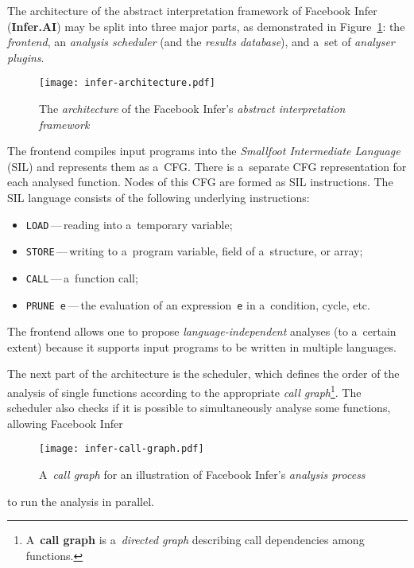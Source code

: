 The architecture of the abstract interpretation framework of Facebook Infer (\textbf{Infer.AI}) may be split into three major parts, as demonstrated in Figure~\ref{fig:inferArch}: the \emph{frontend}, an \emph{analysis scheduler} (and the \emph{results database}), and a~set of \emph{analyser plugins}.

\vfill

\begin{figure}[hbt]
    \centering
    \texttt{[image: infer-architecture.pdf]}
    \caption{The \emph{architecture} of the Facebook Infer's \emph{abstract interpretation framework}~\cite{harmimBP}}
    \label{fig:inferArch}
\end{figure}

\vfill

The frontend compiles input programs into the \emph{Smallfoot Intermediate Language} (SIL) and represents them as a~CFG. There is a~separate CFG representation for each analysed function. Nodes of this CFG are formed as SIL instructions. The SIL language consists of the following underlying instructions:
\begin{itemize}
    \item \texttt{LOAD}\,---\,reading into a~temporary variable;

    \item \texttt{STORE}\,---\,writing to a~program variable, field of a~structure, or array;

    \item \texttt{CALL}\,---\,a~function call;

    \item \texttt{PRUNE~e}\,---\,the evaluation of an expression~\texttt{e} in a~condition, cycle, etc.
\end{itemize}
The frontend allows one to propose \emph{language-independent} analyses (to a~certain extent) because it supports input programs to be written in multiple languages.

\clearpage

The next part of the architecture is the scheduler, which defines the order of the analysis of single functions according to the appropriate \emph{call graph}\footnote{A~\textbf{call graph} is a~\emph{directed graph} describing call dependencies among functions.}. The scheduler also checks if it is possible to simultaneously analyse some functions, allowing Facebook Infer
\begin{wrapfigure}{r}{.45 \linewidth}
    \centering
    \vspace{1.5em}
    \texttt{[image: infer-call-graph.pdf]}
    \caption{A~\emph{call graph} for an illustration of Facebook Infer's \emph{analysis process}~\cite{harmimBP}}
    \label{fig:inferCallGraph}
\end{wrapfigure}
to run the analysis in parallel.

